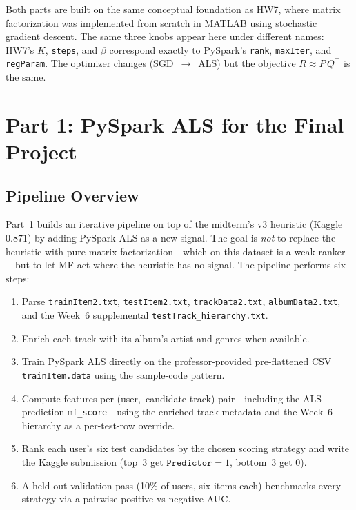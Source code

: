 \documentclass[12pt]{article}
\begin{document}
	Both parts are built on the same conceptual foundation as HW7, where matrix factorization was implemented from scratch in MATLAB using stochastic gradient descent. The same three knobs appear here under different names: HW7's $K$, \texttt{steps}, and $\beta$ correspond exactly to PySpark's \texttt{rank}, \texttt{maxIter}, and \texttt{regParam}. The optimizer changes (SGD~$\rightarrow$~ALS) but the objective $R\approx P\,Q^{\top}$ is the same.

	\newpage
	\section{Part 1: PySpark ALS for the Final Project}\label{sec:part1}

	\subsection{Pipeline Overview}

	Part~1 builds an iterative pipeline on top of the midterm's v3 heuristic (Kaggle $0.871$) by adding PySpark ALS as a new signal. The goal is \emph{not} to replace the heuristic with pure matrix factorization---which on this dataset is a weak ranker---but to let MF act where the heuristic has no signal. The pipeline performs six steps:
	\begin{enumerate}
		\item Parse \texttt{trainItem2.txt}, \texttt{testItem2.txt}, \texttt{trackData2.txt}, \texttt{albumData2.txt}, and the Week~6 supplemental \texttt{testTrack\_hierarchy.txt}.
		\item Enrich each track with its album's artist and genres when available.
		\item Train PySpark ALS directly on the professor-provided pre-flattened CSV \texttt{trainItem.data} using the sample-code pattern.
		\item Compute features per \mbox{(user, candidate-track)} pair---including the ALS prediction \texttt{mf\_score}---using the enriched track metadata and the Week~6 hierarchy as a per-test-row override.
		\item Rank each user's six test candidates by the chosen scoring strategy and write the Kaggle submission (top~3 get $\texttt{Predictor}=1$, bottom~3 get $0$).
		\item A held-out validation pass (10\% of users, six items each) benchmarks every strategy via a pairwise positive-vs-negative AUC.
	\end{enumerate}
\end{document}
